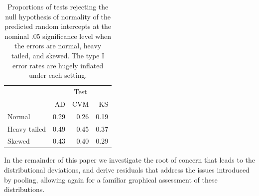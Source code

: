 \documentclass{article} %
\begin{document}
\begin{table}[!h]
\caption{\label{tab:edf} Proportions of tests rejecting the null hypothesis of normality of the predicted random intercepts at the nominal .05 significance level when the errors are normal, heavy tailed, and skewed. The type I error rates are hugely inflated under each setting. \vspace{.5em}
}
\begin{center}
\begin{tabular}{l rrr} \hline
& \multicolumn{3}{c}{Test} \\ \cline{2-4}
  	&     AD & CVM  & KS \\ \hline
Normal       	   	&   0.29 & 0.26 & 0.19 \\ 
Heavy tailed 		&   0.49 & 0.45 & 0.37 \\ 
Skewed       		&   0.43 & 0.40 & 0.29 \\  
\hline
\end{tabular}

\end{center}

\end{table}

In the remainder of this paper we investigate the root of concern that leads to the distributional deviations, and derive residuals that address the issues introduced by pooling, allowing again for a familiar graphical assessment of these distributions.


\end{document}

